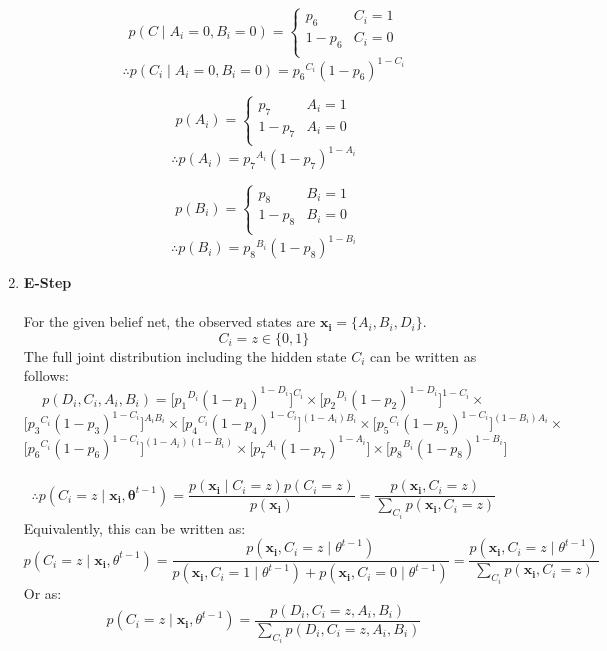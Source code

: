\documentclass[english]{article}
\begin{document}
\begin{enumerate}
    \[ p(C \;|\; A_i = 0, B_i = 0) = \begin{cases} 
    p_6 & C_i = 1\\
    1-p_6 & C_i = 0 \\
    \end{cases}
    \]
    $$\therefore p(C_i \;|\; A_i = 0, B_i = 0) = {p_6}^{C_i}(1-p_6)^{1-C_i}$$
    
    \[ p(A_i) = \begin{cases} 
    p_7 & A_i = 1\\
    1-p_7 & A_i = 0 \\
    \end{cases}
    \]
    $$\therefore p(A_i) = {p_7}^{A_i}(1-p_7)^{1-A_i}$$
    
    \[ p(B_i) = \begin{cases} 
    p_8 & B_i = 1\\
    1-p_8 & B_i = 0 \\
    \end{cases}
    \]
    $$\therefore p(B_i) = {p_8}^{B_i}(1-p_8)^{1-B_i}$$
    
    \item \textbf{E-Step} \\ \\
    For the given belief net, the observed states are $\mathbf{x_i} = \{A_i, B_i, D_i\}$. \\
    $$C_i = z \in \{0,1\}$$
    The full joint distribution including the hidden state $C_i$ can be written as follows:
    $$p(D_i,C_i,A_i,B_i) = \big[{p_1}^{D_i}(1-p_1)^{1-D_i}\big]^{C_i} \times \big[{p_2}^{D_i}(1-p_2)^{1-D_i}\big]^{1-C_i} \times$$
    $$\big[{p_3}^{C_i}(1-p_3)^{1-C_i}\big]^{A_iB_i} \times \big[{p_4}^{C_i}(1-p_4)^{1-C_i}\big]^{(1-A_i)B_i} \times \big[{p_5}^{C_i}(1-p_5)^{1-C_i}\big]^{(1-B_i)A_i} \times$$
    $$\big[{p_6}^{C_i}(1-p_6)^{1-C_i}\big]^{(1-A_i)(1-B_i)} \times \big[{p_7}^{A_i}(1-p_7)^{1-A_i}\big] \times \big[{p_8}^{B_i}(1-p_8)^{1-B_i}\big]$$
    \\ 
    $$\therefore p(C_i = z \;|\; \mathbf{x_i}, \bm{\theta}^{t-1}) = \frac{p(\mathbf{x_i} \;|\;  C_i = z) p(C_i = z)}{p(\mathbf{x_i})} = \frac{p(\mathbf{x_i},C_i = z)}{\sum_{C_i} p(\mathbf{x_i}, C_i = z)}$$
    Equivalently, this can be written as:
    $$p(C_i = z\;|\; \mathbf{x_i}, \theta^{t-1}) = \frac{p(\mathbf{x_i}, C_i = z \;|\; \theta^{t-1})}{p(\mathbf{x_i}, C_i = 1 \;|\; \theta^{t-1}) + p(\mathbf{x_i}, C_i = 0 \;|\; \theta^{t-1})} = \frac{p(\mathbf{x_i}, C_i = z \;|\; \theta^{t-1})}{\sum_{C_i} p(\mathbf{x_i}, C_i = z)}$$
    Or as:
    $$p(C_i = z\;|\; \mathbf{x_i}, \theta^{t-1}) = \frac{p(D_i,C_i = z,A_i,B_i)}{\sum_{C_i} p(D_i,C_i = z,A_i,B_i)}$$


\end{enumerate}
\end{document}
